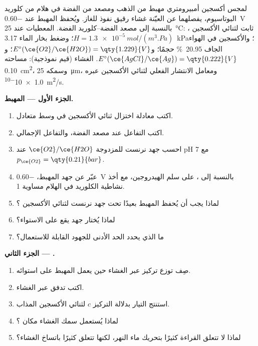 \begin{problem}
\label{pb:b2:current-potential-curves:1}
لمجس أكسجين أمبيرومتري مهبط من الذهب ومصعد من الفضة في
هلام من كلوريد البوتاسيوم، يفصلهما عن العيّنة غشاء رقيق نفوذ للغاز.
ويُحفظ المهبط عند \qty{-0.60}{V} بالنسبة إلى مصعد الفضة--كلوريد
الفضة. المعطيات عند \qty{25}{\degreeCelsius}: ثابت 
لثنائي الأكسجين ، $H = \qty{1.3e-5}{mol/(m^3.Pa)}$؛ وضغط بخار الماء
\qty{3.17}{kPa}؛ والأكسجين في الهواء الجاف 20.95~\% حجمًا؛ و$E^\circ(\ce{O2}/\ce{H2O}) =
\qty{1.229}{V}$؛ و$E^\circ(\ce{AgCl}/\ce{Ag}) = \qty{0.222}{V}$. الغشاء (قيم
نموذجية): مساحته \qty{0.10}{cm^2}، وسمكه \qty{25}{\micro m}، ومعامل الانتشار
الفعلي لثنائي الأكسجين  عبره \qty{1.0e-10}{m^2/s}.

\medskip
\noindent\textbf{الجزء الأول --- المهبط.}
\begin{enumerate}
  \item اكتب معادلة اختزال ثنائي الأكسجين في وسط متعادل.
  \item اكتب التفاعل عند مصعد الفضة، والتفاعل الإجمالي.
  \item احسب جهد نرنست للمزدوجة $\ce{O2}/\ce{H2O}$ عند pH 7 مع
        $p_{\ce{O2}} = \qty{0.21}{bar}$.
  \item عبّر عن جهد المهبط، \qty{-0.60}{V} بالنسبة إلى ، على
        سلم الهيدروجين، مع أخذ نشاطية الكلوريد في الهلام مساوية 1.
  \item لماذا يجب أن يُحفظ المهبط بعيدًا تحت جهد نرنست
        لثنائي الأكسجين ؟
  \item لماذا يُختار جهد يقع على الاستواء؟
  \item ما الذي يحدد الحد الأدنى للجهود القابلة للاستعمال؟
\end{enumerate}

\medskip
\noindent\textbf{الجزء الثاني --- .}
\begin{enumerate}[resume]
  \item صِف توزع تركيز  عبر الغشاء حين يعمل
        المهبط على استوائه.
  \item اكتب تدفق  عبر الغشاء.
  \item استنتج التيار بدلالة التركيز $c$ لثنائي الأكسجين
         المذاب.
  \item لماذا يُستعمل سمك الغشاء مكان ؟
  \item لماذا لا تتعلق القراءة كثيرًا بتحريك ماء النهر، لكنها
        تتعلق كثيرًا باتساخ الغشاء؟
\end{enumerate}


\end{problem}
